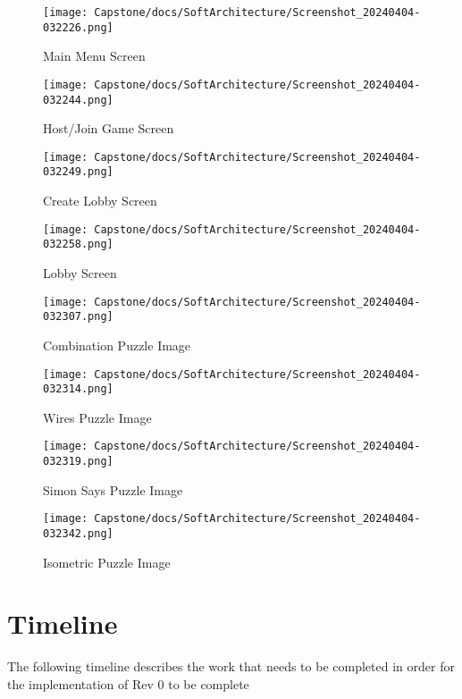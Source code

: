 \documentclass[12pt, titlepage]{article}
\begin{document}
\begin{figure}[H]
\centering
\texttt{[image: Capstone/docs/SoftArchitecture/Screenshot\_20240404-032226.png]}
\caption{Main Menu Screen}
\label{FigUI2}
\end{figure}

\begin{figure}[H]
\centering
\texttt{[image: Capstone/docs/SoftArchitecture/Screenshot\_20240404-032244.png]}
\caption{Host/Join Game Screen}
\label{FigUI3}
\end{figure}

\begin{figure}[H]
\centering
\texttt{[image: Capstone/docs/SoftArchitecture/Screenshot\_20240404-032249.png]}
\caption{Create Lobby Screen}
\label{FigUI4}
\end{figure}


\begin{figure}[H]
\centering
\texttt{[image: Capstone/docs/SoftArchitecture/Screenshot\_20240404-032258.png]}
\caption{Lobby Screen}
\label{FigUI5}
\end{figure}


\begin{figure}[H]
\centering
\texttt{[image: Capstone/docs/SoftArchitecture/Screenshot\_20240404-032307.png]}
\caption{Combination Puzzle Image}
\label{FigUI6}
\end{figure}

\begin{figure}[H]
\centering
\texttt{[image: Capstone/docs/SoftArchitecture/Screenshot\_20240404-032314.png]}
\caption{Wires Puzzle Image}
\label{FigUI6}
\end{figure}
\begin{figure}[H]
\centering
\texttt{[image: Capstone/docs/SoftArchitecture/Screenshot\_20240404-032319.png]}
\caption{Simon Says Puzzle Image}
\label{FigUI6}
\end{figure}

\begin{figure}[H]
\centering
\texttt{[image: Capstone/docs/SoftArchitecture/Screenshot\_20240404-032342.png]}
\caption{Isometric Puzzle Image}
\label{FigUI6}
\end{figure}

\section{Timeline} \label{Rev0Timeline}
The following timeline describes the work that needs to be completed in order for the implementation of Rev 0 to be complete
\end{document}
